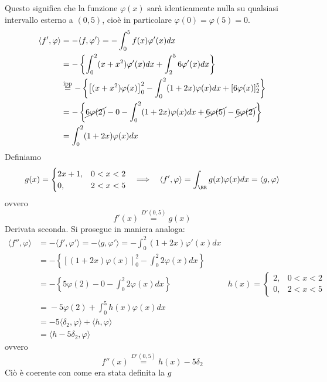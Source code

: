 Questo significa che la funzione $\varphi (x)$ sarà identicamente nulla su qualsiasi intervallo esterno a $(0, 5)$, cioè in particolare $\varphi (0) = \varphi (5) = 0$.
\begin{align*}
\langle f', \varphi \rangle & = - \langle f, \varphi'\rangle = - \int^{5}_{0} f(x)\varphi'(x)dx\\
 & = - \left\{\int^{2}_{0} (x + x^{2})\varphi'(x)dx + \int^{5}_{2} 6\varphi'(x)dx\right\}\\
 & \overset{\text{ipp}}{=} - \left\{\left[ (x + x^{2})\varphi (x)\right]^{2}_{0} - \int^{2}_{0} (1 + 2x)\varphi (x)dx + [ 6\varphi (x)]^{5}_{2}\right\}\\
 & = - \left\{\cancel{6\varphi (2)} - 0 - \int^{2}_{0}(1 + 2x) \varphi (x) dx + \cancel{6\varphi (5)} - \cancel{6\varphi (2)}\right\}\\
 & = \int^{2}_{0}(1 + 2x) \varphi (x) dx
\end{align*}
Definiamo
\begin{equation*}
g(x) =
\begin{cases}
2x + 1, & 0 < x < 2\\
0, & 2 < x < 5
\end{cases} \ \ \implies \ \ \langle f', \varphi \rangle = \int_{\RR} g(x) \varphi (x) dx = \langle g, \varphi \rangle
\end{equation*}
ovvero
\begin{equation*}
f'(x)\overset{D'(0, 5)}{=} g(x)
\end{equation*}
Derivata seconda. Si prosegue in maniera analoga:
\begin{equation*}
\begin{aligned}
\langle f'', \varphi \rangle & = - \langle f', \varphi'\rangle = - \langle g, \varphi'\rangle = - \int^{2}_{0} (1 + 2x)\varphi'(x)dx & \\
 & = - \left\{[ (1 + 2x)\varphi (x)]^{2}_{0} - \int^{2}_{0} 2\varphi (x)dx\right\} & \\
 & = - \left\{5\varphi (2) - 0 - \int^{2}_{0} 2\varphi (x)dx\right\} & h(x) =
\begin{cases}
2, & 0 < x < 2\\
0, & 2 < x < 5
\end{cases}\\
 & \overset{}{=} - 5\varphi (2) + \int^{5}_{0} h(x)\varphi (x)dx & \\
 & = - 5\langle \delta_{2}, \varphi \rangle + \langle h, \varphi \rangle & \\
 & = \langle h - 5\delta_{2}, \varphi \rangle &
\end{aligned}
\end{equation*}
ovvero
\begin{equation*}
f''(x)\overset{D'(0, 5)}{=} h(x) - 5\delta_{2}
\end{equation*}
Ciò è coerente con come era stata definita la $g$


